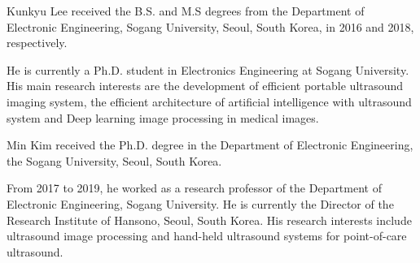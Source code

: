 \begin{IEEEbiography}{Kunkyu Lee}
received the B.S. and M.S degrees from the Department of Electronic Engineering, Sogang University, Seoul, South Korea, in 2016 and 2018, respectively.

He is currently a Ph.D. student in Electronics Engineering at Sogang University.
His main research interests are the development of efficient portable ultrasound imaging system, the efficient architecture of artificial intelligence with ultrasound system and Deep learning image processing in medical images.
\end{IEEEbiography}

\begin{IEEEbiography}{Min Kim} received the Ph.D. degree in the Department of Electronic Engineering, the Sogang University, Seoul, South Korea. 

From 2017 to 2019, he worked as a research professor of the Department of Electronic Engineering, Sogang University. 
He is currently the Director of the Research Institute of Hansono, Seoul, South Korea. 
His research interests include ultrasound image processing and hand-held ultrasound systems for point-of-care ultrasound.
\end{IEEEbiography}

